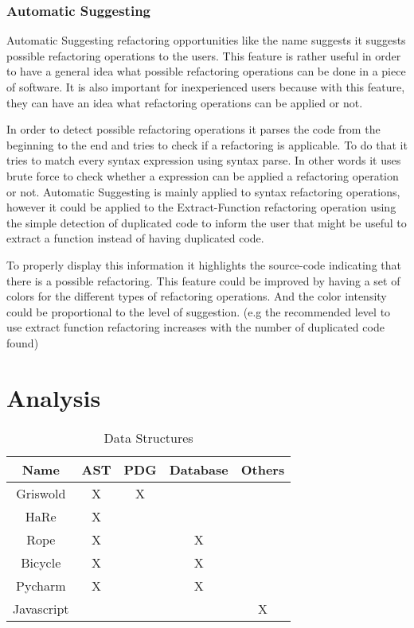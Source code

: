
\subsubsection{Automatic Suggesting}
Automatic Suggesting refactoring opportunities like the name suggests it suggests
possible refactoring operations to the users.
This feature is rather useful in order to have a general idea what possible refactoring
operations can be done in a piece of software. %
It is also important for inexperienced users because with this feature,
they can have an idea what refactoring operations can be applied or not.


In order to detect possible refactoring operations it parses the code from the
beginning to the end and tries to check if a refactoring is applicable.
To do that it tries to match every syntax expression using syntax parse.
In other words it uses brute force to check whether a expression can be applied
a refactoring operation or not.
Automatic Suggesting is mainly applied to syntax refactoring operations, however
it could be applied to the Extract-Function refactoring operation using the
simple detection of duplicated code to inform the user that might be useful
to extract a function instead of having duplicated code. %

To properly display this information it highlights the source-code indicating
that there is a possible refactoring.
This feature could be improved by having a set of colors for the different types
of refactoring operations. And the color intensity could be proportional to the level
of suggestion. (e.g the recommended level to use extract function refactoring
increases with the number of duplicated code found) %


\section{Analysis}
\begin{table}[]
\centering
\caption{Data Structures}
\label{my-label}
\begin{tabular}{c|c|c|c|c}
Name       & AST & PDG & Database & Others \\ \hline
Griswold   & X   & X   &          &        \\ \hline
HaRe       & X   &     &          &        \\ \hline
Rope       & X   &     & X        &        \\ \hline
Bicycle    & X   &     & X        &        \\ \hline
Pycharm    & X   &     & X        &        \\ \hline
Javascript &     &     &          & X
\end{tabular}
\end{table}

